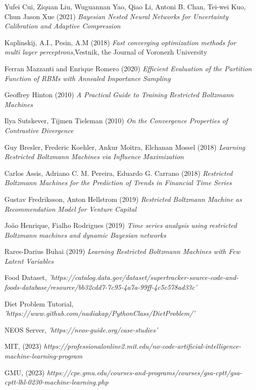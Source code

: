 \documentclass{article} %
\begin{document}
\begin{thebibliography}{9}
Yufei Cui, Ziquan Liu, Wuguannan Yao, Qiao Li, Antoni B. Chan, Tei-wei Kuo, Chun Jason Xue (2021) \emph{Bayesian Nested Neural Networks for Uncertainty Calibration and Adaptive Compression}

Kaplinskij, A.I., Pesin, A.M (2018) \emph{ Fast converging optimization methods for multi layer perceptrons},Vestnik, the Journal of Voronezh University

Ferran Mazzanti and Enrique Romero (2020)  \emph{Efficient Evaluation of the Partition Function of  RBMs with Annealed Importance Sampling}

Geoffrey Hinton (2010)  \emph{A Practical Guide to Training Restricted Boltzmann Machines}

Ilya Sutskever, Tijmen Tieleman (2010)  \emph{On the Convergence Properties of Contrastive Divergence}

 Guy Bresler, Frederic Koehler, Ankur Moitra, Elchanan Mossel (2018)  \emph{Learning Restricted Boltzmann Machines via Influence Maximization}

Carlos Assis, Adriano C. M. Pereira, Eduardo G. Carrano  (2018)  \emph{Restricted Boltzmann Machines for the Prediction of Trends in Financial Time Series}

Gustav Fredriksson, Anton Hellstrom (2019)  \emph{Restricted Boltzmann Machine as Recommendation Model for Venture Capital}

João Henrique, Fialho Rodrigues (2019) \emph{Time series analysis using restricted Boltzmann machines and dynamic Bayesian networks}

Rares-Darius Buhai (2019) \emph{Learning Restricted Boltzmann Machines with Few Latent Variables}

Food Dataset, \emph{ 'https://catalog.data.gov/dataset/supertracker-source-code-and-foods-database/resource/bb32cdd7-7c95-4a7a-99ff-4c5c578ad33c'}

Diet Problem Tutorial, \emph{'https://www.github.com/nadiakap/PythonClass/DietProblem/'}

NEOS Server, \emph{ 'https://neos-guide.org/case-studies'}

MIT, (2023) \emph{https://professionalonline2.mit.edu/no-code-artificial-intelligence-machine-learning-program}

GMU, (2023) \emph{ https://cpe.gmu.edu/courses-and-programs/courses/gsa-cptt/gsa-cptt-lhl-0230-machine-learning.php}


\end{thebibliography}
\end{document}
